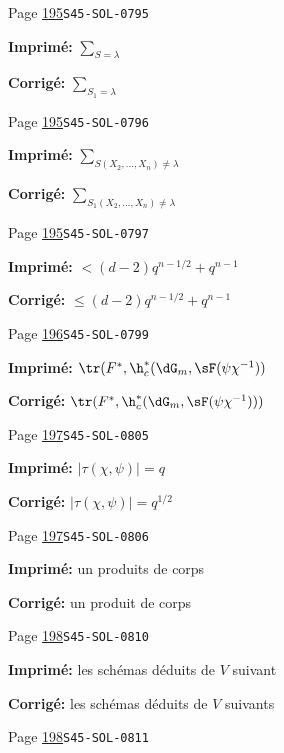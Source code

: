 \begin{description}
\smallskip
\item[\hypertarget{apparatus:FR-0173}{173}] Page \hyperlink{printpage:fr:195}{195}\quad\texttt{S45-SOL-0795}
\par\noindent\textbf{Imprimé:} \(\sum_{S=\lambda}\)
\par\noindent\textbf{Corrigé:} \(\sum_{S_1=\lambda}\)
\smallskip
\item[\hypertarget{apparatus:FR-0174}{174}] Page \hyperlink{printpage:fr:195}{195}\quad\texttt{S45-SOL-0796}
\par\noindent\textbf{Imprimé:} \(\sum_{S(X_2,\dots,X_n)\ne\lambda}\)
\par\noindent\textbf{Corrigé:} \(\sum_{S_1(X_2,\dots,X_n)\ne\lambda}\)
\smallskip
\item[\hypertarget{apparatus:FR-0175}{175}] Page \hyperlink{printpage:fr:195}{195}\quad\texttt{S45-SOL-0797}
\par\noindent\textbf{Imprimé:} \(< (d-2) q^{n-1/2} + q^{n-1}\)
\par\noindent\textbf{Corrigé:} \(\leqslant (d-2) q^{n-1/2} + q^{n-1}\)
\smallskip
\item[\hypertarget{apparatus:FR-0176}{176}] Page \hyperlink{printpage:fr:196}{196}\quad\texttt{S45-SOL-0799}
\par\noindent\textbf{Imprimé:} \(\tr(F^\ast,\h_c^\ast(\dG_m,\sF(\psi \chi^{-1}))\)
\par\noindent\textbf{Corrigé:} \(\tr(F^\ast,\h_c^\ast(\dG_m,\sF(\psi \chi^{-1})))\)
\smallskip
\item[\hypertarget{apparatus:FR-0177}{177}] Page \hyperlink{printpage:fr:197}{197}\quad\texttt{S45-SOL-0805}
\par\noindent\textbf{Imprimé:} \(|\tau(\chi,\psi)|=q\)
\par\noindent\textbf{Corrigé:} \(|\tau(\chi,\psi)|=q^{1/2}\)
\smallskip
\item[\hypertarget{apparatus:FR-0178}{178}] Page \hyperlink{printpage:fr:197}{197}\quad\texttt{S45-SOL-0806}
\par\noindent\textbf{Imprimé:} un produits de corps
\par\noindent\textbf{Corrigé:} un produit de corps
\smallskip
\item[\hypertarget{apparatus:FR-0179}{179}] Page \hyperlink{printpage:fr:198}{198}\quad\texttt{S45-SOL-0810}
\par\noindent\textbf{Imprimé:} les schémas déduits de $V$ suivant
\par\noindent\textbf{Corrigé:} les schémas déduits de $V$ suivants
\smallskip
\item[\hypertarget{apparatus:FR-0180}{180}] Page \hyperlink{printpage:fr:198}{198}\quad\texttt{S45-SOL-0811}

\end{description}
